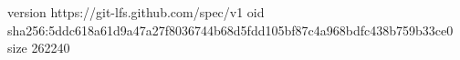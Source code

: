 version https://git-lfs.github.com/spec/v1
oid sha256:5ddc618a61d9a47a27f8036744b68d5fdd105bf87c4a968bdfc438b759b33ce0
size 262240
